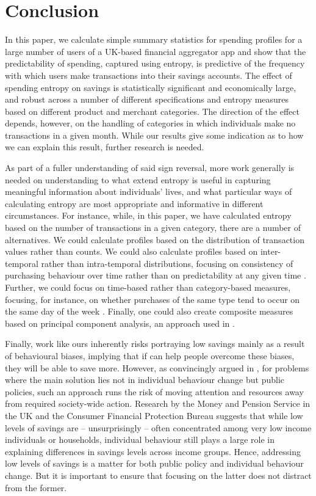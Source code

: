 
\section{Conclusion}
\label{sec:conclusion}

In this paper, we calculate simple summary statistics for spending profiles for
a large number of users of a UK-based financial aggregator app and show that
the predictability of spending, captured using entropy, is predictive of the
frequency with which users make transactions into their savings accounts. The
effect of spending entropy on savings is statistically significant and
economically large, and robust across a number of different specifications and
entropy measures based on different product and merchant categories. The
direction of the effect depends, however, on the handling of categories in
which individuals make no transactions in a given month. While our results give
some indication as to how we can explain this result, further research is
needed.

As part of a fuller understanding of said sign reversal, more work generally is
needed on understanding to what extend entropy is useful in capturing
meaningful information about individuals' lives, and what particular ways of
calculating entropy are most appropriate and informative in different
circumstances. For instance, while, in this paper, we have calculated entropy
based on the number of transactions in a given category, there are a number of
alternatives. We could calculate profiles based on the distribution of
transaction values rather than counts. We could also calculate profiles based
on inter-temporal rather than intra-temporal distributions, focusing on
consistency of purchasing behaviour over time rather than on predictability at
any given time \citep{krumme2013predictability}. Further, we could focus on
time-based rather than category-based measures, focusing, for instance, on
whether purchases of the same type tend to occur on the same day of the week
\citep{guidotti2015behavioral}. Finally, one could also create composite
measures based on principal component analysis, an approach used in
\citet{eagle2010network}.

Finally, work like ours inherently risks portraying low savings mainly as a
result of behavioural biases, implying that if can help people overcome these
biases, they will be able to save more. However, as convincingly argued in
\citet{chater2022frame}, for problems where the main solution lies not in
individual behaviour change but public policies, such an approach runs the risk
of moving attention and resources away from required society-wide action.
Research by the Money and Pension Service in the UK \citep{mps2018building} and
the Consumer Financial Protection Bureau \citep{cfpb2017financial} suggests
that while low levels of savings are -- unsurprisingly -- often concentrated
among very low income individuals or households, individual behaviour still
plays a large role in explaining differences in savings levels across income
groups. Hence, addressing low levels of savings is a matter for both public
policy and individual behaviour change. But it is important to ensure that
focusing on the latter does not distract from the former.
